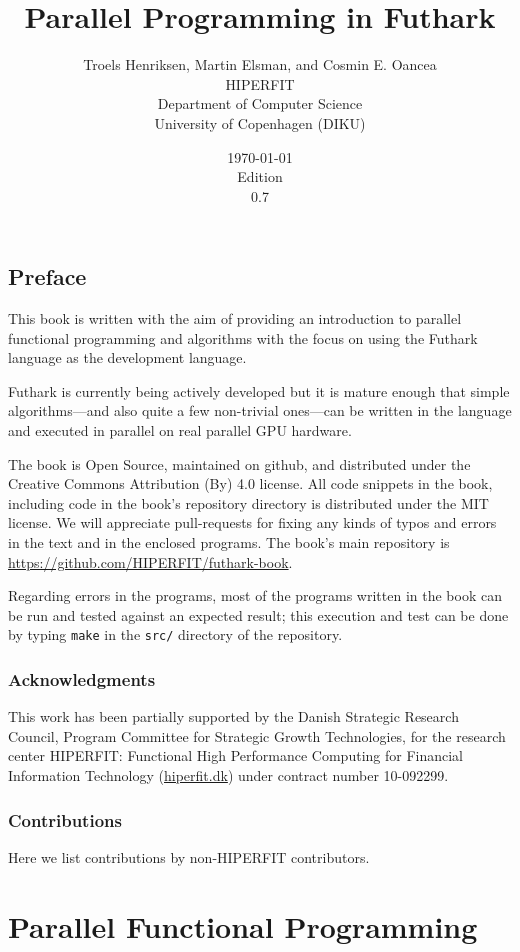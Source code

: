 \documentclass[oneside,11pt]{book}
\title{\bf Parallel Programming in Futhark}
\author{Troels Henriksen, Martin Elsman, and Cosmin E. Oancea \\[2mm] HIPERFIT \\[2mm] Department of Computer Science \\ University of Copenhagen (DIKU)}
\date{\today \\[5mm] Edition \\ 0.7}
\begin{document}
\frontmatter
\maketitle
\chapter{Preface}

This book is written with the aim of providing an introduction to
parallel functional programming and algorithms with the focus on using
the Futhark language as the development language.

Futhark is currently being actively developed but it is mature enough
that simple algorithms---and also quite a few non-trivial ones---can
be written in the language and executed in parallel on real parallel
GPU hardware.

The book is Open Source, maintained on github, and distributed under
the Creative Commons Attribution (By) 4.0 license. All code snippets
in the book, including code in the book's repository directory is
distributed under the MIT license. We will appreciate pull-requests
for fixing any kinds of typos and errors in the text and in the
enclosed programs. The book's main repository is \url{https://github.com/HIPERFIT/futhark-book}.

Regarding errors in the programs, most of the
programs written in the book can be run and tested against an expected
result; this execution and test can be done by typing \texttt{make} in
the \texttt{src/} directory of the repository.

\section*{Acknowledgments}
This work has been partially supported by the Danish Strategic Research
Council, Program Committee for Strategic Growth Technologies, for the
research center HIPERFIT: Functional High Performance Computing for
Financial Information Technology (\url{hiperfit.dk}) under contract number
10-092299.

\section*{Contributions}
Here we list contributions by non-HIPERFIT contributors.


\tableofcontents
\mainmatter
\part{Parallel Functional Programming}
\end{document}
